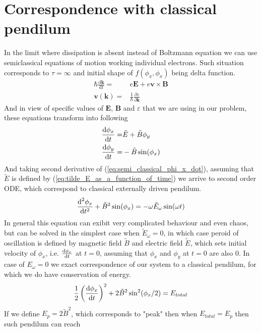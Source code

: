 \documentclass[40pt,letterpaper,physrev]{article}
\begin{document}
    \section{Correspondence with classical pendilum}
    In the limit where dissipation is absent instead of Boltzmann
    equation we can use semiclassical equations of motion working 
    individual electrons. Such situation corresponds to $\tau=\infty$ and initial shape of $f(\phi_x,\phi_x)$ being delta function. 
    \begin{align}
    	\hbar\frac{\text{d}\mathbf{k}}{\text{d}t}=&e\mathbf{E}+e\mathbf{v}\times\mathbf{B} \\
    	\mathbf{v}(\mathbf{k})=&\frac{1}{\hbar}\frac{\partial\varepsilon}{\partial\mathbf{k}}
    \end{align}
    And in view of specific values of $\mathbf{E}$, $\mathbf{B}$ and $\varepsilon$ that we are using in our problem, these equations transform into following
    \begin{align}
	    \frac{\text{d}\phi_x}{\text{d}t}=&\tilde{E}+\tilde{B}\phi_y \label{eq:semi_classical_phi_x_dot} \\
	    \frac{\text{d}\phi_y}{\text{d}t}=&-\tilde{B}\sin(\phi_x) \label{eq:semi_classical_phi_y_dot}
    \end{align}
    And taking second derivative of (\ref{eq:semi_classical_phi_x_dot}), assuming that $\tilde{E}$ is defined 
    by (\ref{eq:tilde_E_as_a_function_of_time}) we arrive to second order ODE, which correspond to classical externally
    driven pendilum.
    \begin{equation}
    	\frac{\text{d}^{2}\phi_x}{\text{d}t^{2}}+\tilde{B}^2\sin(\phi_x)=-\omega\tilde{E}_\omega\sin(\omega t)
    \end{equation}
    In general this equation can exibit very complicated behaviour and even chaos, but can be solved in the simplest case when $\tilde{E}_\omega=0$, in which case peroid of oscillation is defined by magnetic field $\tilde{B}$ and electric field $\tilde{E}$, which sets initial velocity of $\phi_x$, i.e. $\frac{\text{d}\phi_x}{\text{d}t}$ at $t=0$, assuming that $\phi_x$ and $\phi_y$ at $t=0$ are also $0$. In case of $E_\omega=0$ we exact correspondence of our system to a classical pendilum, for which 
    we do have conservation of energy.
    \begin{equation}
    \frac{1}{2}\left ( \frac{\text{d}\phi_x}{\text{d}t} \right  )^2+2\tilde{B}^2\sin^2(\phi_x/2)=E_{total}
    \end{equation}
    If we define $E_p=2\tilde{B}^2$, which corresponds to 
    "peak" then when $E_{total}=E_p$ then such pendilum can reach 
\end{document}
